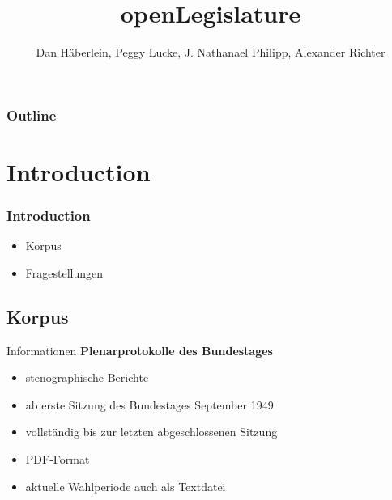 \documentclass[11pt, a4paper]{beamer}
\author{Dan Häberlein, Peggy Lucke, J. Nathanael Philipp, Alexander Richter}
\title{openLegislature}
\date{}
\institute{Universität Leipzig}
\begin{document}
\section{}
\begin{frame}
\titlepage
\end{frame}


	\begin{frame}
		\frametitle{Outline}
		\tableofcontents
	\end{frame}

\section{Introduction}
\begin{frame}
\frametitle{Introduction}
\begin{itemize}
\item Korpus
\item Fragestellungen
\end{itemize}
\end{frame}

\subsection{Korpus}
\begin{frame}{Informationen}
\textbf{Plenarprotokolle des Bundestages}
\begin{itemize}
\item stenographische Berichte
\item ab erste Sitzung des Bundestages September 1949
\item vollständig bis zur letzten abgeschlossenen Sitzung
\item PDF-Format
\item aktuelle Wahlperiode auch als Textdatei
\end{itemize}
\end{frame}
\end{document}
